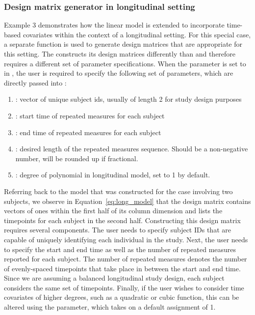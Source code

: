 \subsubsection{Design matrix generator in longitudinal setting}\label{subsubsec:long_designmatrix}
Example 3 demonstrates how the 
linear model is extended to incorporate time-based 
covariates within the context of a longitudinal setting. For this
special case, a separate function is used to generate
design matrices that are appropriate for this setting. 
The  constructs
its design matrices differently than  
and therefore requires a different set of parameter specifications.
When the  parameter is
set to  in , 
the user is required to specify the following set
of parameters, which are directly passed into 
: 

\begin{enumerate}
\item{: vector of unique subject ids, usually of length 2
for study design purposes}
\item{: start time of repeated measures for
each subject}
\item{: end time of repeated measures for
each subject}
\item{: desired length of the repeated measures sequence. Should be a non-negative number, will be rounded up if fractional.}
\item{:  degree of polynomial in longitudinal model, set to 1 by default.}
\end{enumerate}

Referring back to the model that was constructed for the 
case involving two subjects,  we observe in 
Equation~\eqref{eq:long_model} that the
design matrix contains vectors of ones within the first half
of its column dimension and lists the timepoints 
for each subject in the second half. Constructing this
design matrix requires several components. The user needs to
specify subject IDs that are capable of uniquely
identifying each individual in the study.  
Next, the user needs to specify the start and end time 
as well as the number of repeated measures reported 
for each subject. The number of repeated measures 
denotes the number of evenly-spaced timepoints that 
take place in between the start and end time. 
Since we are assuming a balanced longitudinal 
study design, each subject
considers the same set of timepoints. Finally, if the user
wishes to consider time covariates of higher degrees, such as 
a quadratic or cubic function, this can be altered using 
the  parameter, which takes on
a default assignment of 1. 


